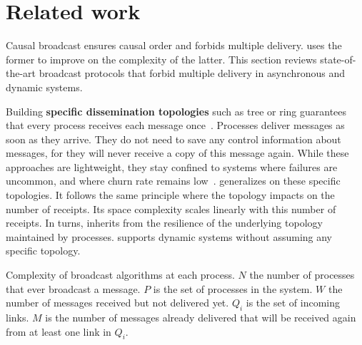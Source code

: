 
\section{Related work}
\label{sec:relatedwork}

Causal broadcast ensures causal order and forbids multiple
delivery. \RPCBROADCAST uses the former to improve on the complexity of the
latter.  This section reviews state-of-the-art broadcast protocols that forbid
multiple delivery in asynchronous and dynamic systems.

Building \textbf{specific dissemination topologies} such as tree or ring
guarantees that every process receives each message
once~\cite{bravo2017saturn,raynal2013distributed}. Processes deliver messages as
soon as they arrive. They do not need to save any control information about
messages, for they will never receive a copy of this message again. While these
approaches are lightweight, they stay confined to systems where failures are
uncommon, and where churn rate remains
low~\cite{krasikova2016hashtable}. \RPCBROADCAST generalizes on these specific
topologies. It follows the same principle where the topology impacts on the
number of receipts. Its space complexity scales linearly with this number of
receipts. In turns, \RPCBROADCAST inherits from the resilience of the underlying
topology maintained by processes. \RPCBROADCAST supports dynamic systems without
assuming any specific topology.

\begin{table*}
  \begin{center}
    \caption{\label{table:complexity} Complexity of broadcast algorithms at each
      process. $N$ the number of processes that ever broadcast a message. $P$ is
      the set of processes in the system. $W$ the number of messages received
      but not delivered yet. $Q_i$ is the set of incoming links. $M$ is the
      number of messages already delivered that will be received again from at
      least one link in $Q_i$.}
  
  \end{center}
\end{table*}


